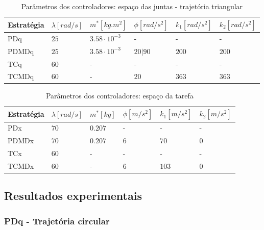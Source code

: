 \documentclass[]{politex}
\begin{document}
\begin{table}[H] 
\centering
\caption{Parâmetros dos controladores: espaço das juntas - trajetória triangular}
\label{tab:parametrosControleAtuadoresTriangulo}
\begin{tabular}{l|l|l|l|l|l}
Estratégia & $\lambda [rad/s]$  & $m^*[kg.m^2]$         & $\phi[rad/s^2]$   & $k_1[rad/s^2]$ & $k_2[rad/s^2]$ \\ \hline
PDq        & $25$               & $3.58 \cdot 10^{-3}$  & -         & -              & -              \\
PDMDq      & $25$               & $3.58 \cdot 10^{-3}$  & $20 | 90$ & $200$          & $200$          \\
TCq        & $60$               & -                     & -         & -              & -              \\
TCMDq      & $60$               & -                     & $20$      & $363$          & $363$          \\
\end{tabular}
\end{table}

\begin{table}[H] 
\centering
\caption{Parâmetros dos controladores: espaço da tarefa}
\label{tab:parametrosControleEfetuador}
\begin{tabular}{l|l|l|l|l|l}
Estratégia & $\lambda [rad/s]$  & $m^*[kg]$ & $\phi[m/s^2]$ & $k_1[m/s^2]$ & $k_2[m/s^2]$ \\ \hline
PDx        & $70$               & $0.207$   & -             & -            & -            \\
PDMDx      & $70$               & $0.207$   & $6$           & $70$         & $0$          \\
TCx        & $60$               & -         & -             & -            & -            \\
TCMDx      & $60$               & -         & $6$           & $103$        & $0$          \\
\end{tabular}
\end{table}

\newpage

\subsection{Resultados experimentais}

\subsubsection{PDq - Trajetória circular}
\end{document}
